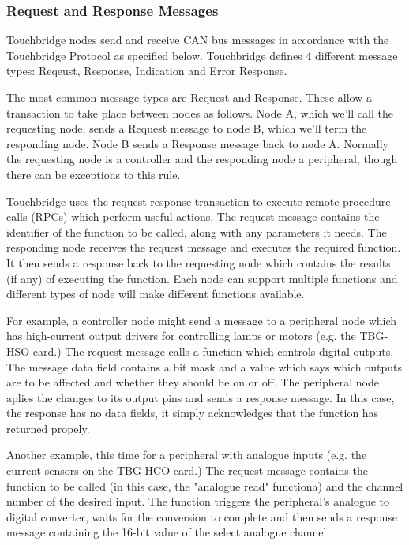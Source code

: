 \documentclass[12pt]{article}
\begin{document}
\subsubsection{Request and Response Messages}

Touchbridge nodes send and receive CAN bus messages in accordance with
the Touchbridge Protocol as specified below. Touchbridge defines 4 different
message types: Reqeust, Response, Indication and Error Response.

The most common message types are Request and Response. These allow a
transaction to take place between nodes as follows. Node A, which we'll call
the requesting node, sends a Request message to node B, which we'll term the
responding node. Node B sends a Response message back to node A. Normally the
requesting node is a controller and the responding node a peripheral, though
there can be exceptions to this rule.

Touchbridge uses the request-response transaction to execute remote procedure
calls (RPCs) which perform useful actions. The request message contains the
identifier of the function to be called, along with any parameters it needs.
The responding node receives the request message and executes the required
function. It then sends a response back to the requesting node which contains
the results (if any) of executing the function. Each node can support multiple
functions and different types of node will make different functions available.

For example, a controller node might send a message to a peripheral node which
has high-current output drivers for controlling lamps or motors (e.g. the
TBG-HSO card.) The request message calls a function which controls digital
outputs.  The message data field contains a bit mask and a value which says
which outputs are to be affected and whether they should be on or off. The
peripheral node aplies the changes to its output pins and sends a response
message. In this case, the response has no data fields, it simply acknowledges
that the function has returned propely.

Another example, this time for a peripheral with analogue inputs (e.g. the
current sensors on the TBG-HCO card.) The request message contains the function
to be called (in this case, the "analogue read" functiona) and the channel
number of the desired input. The function triggers the peripheral's analogue to
digital converter, waits for the conversion to complete and then sends a
response message containing the 16-bit value of the select analogue channel.
\end{document}
